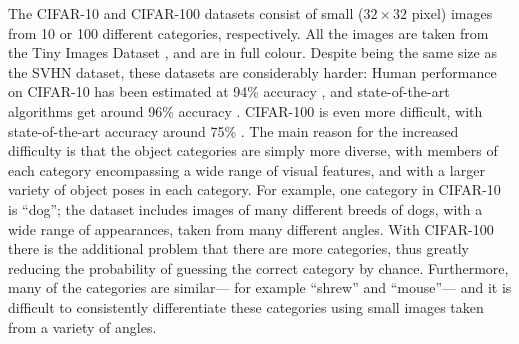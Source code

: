 The CIFAR-10 and CIFAR-100 datasets \parencite{Krizhevsky2009}
consist of small ($32 \times 32$ pixel) images from
10 or 100 different categories, respectively.
All the images are taken from the Tiny Images Dataset \parencite{Torralba2008},
and are in full colour.
Despite being the same size as the SVHN dataset,
these datasets are considerably harder:
Human performance on CIFAR-10 has been estimated at 94\% accuracy \parencite{Karpathy2011},
and state-of-the-art algorithms get around 96\% accuracy \parencite{Springenberg2015,Graham2015}.
CIFAR-100 is even more difficult,
with state-of-the-art accuracy around 75\% \parencite{Graham2014a,Clevert2015a}.
The main reason for the increased difficulty is that the object categories
are simply more diverse,
with members of each category encompassing a wide range of visual features,
and with a larger variety of object poses in each category.
For example, one category in CIFAR-10 is ``dog'';
the dataset includes images of many different breeds of dogs,
with a wide range of appearances,
taken from many different angles.
With CIFAR-100 there is the additional problem that there are more categories,
thus greatly reducing the probability of guessing the correct category by chance.
Furthermore, many of the categories are similar---%
for example ``shrew'' and ``mouse''---%
and it is difficult to consistently differentiate these categories
using small images taken from a variety of angles.

